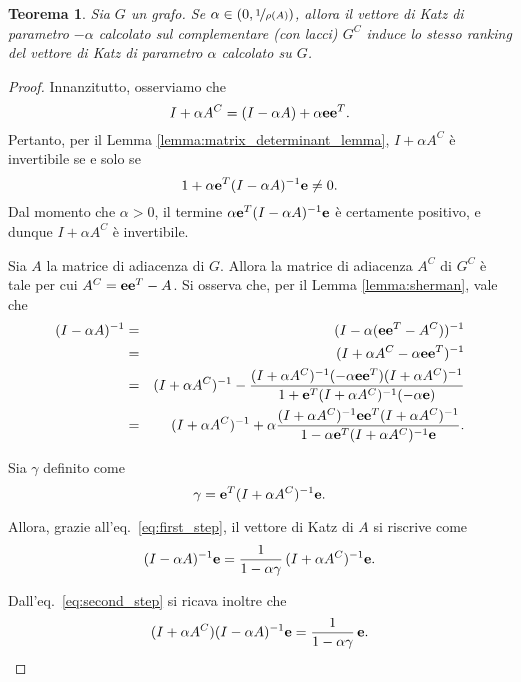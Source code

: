 \documentclass[a4paper]{article}
\newcommand{\evec}{{\bf e}}
\newtheorem{theorem}{Teorema}
\begin{document}
\begin{theorem}
    \label{th:compl_1}
    Sia $G$ un grafo. Se $\alpha \in (0, \nicefrac{1}{\rho(A)})$, allora il vettore di Katz di parametro $-\alpha$ calcolato sul complementare (con lacci) $G^C$
    induce lo stesso ranking del vettore di Katz di parametro $\alpha$ calcolato su $G$.
\end{theorem}

\begin{proof}
    Innanzitutto, osserviamo che
    \[ I+\alpha A^C = (I-\alpha A)+\alpha \evec \evec^T. \]
    Pertanto, per il Lemma \ref{lemma:matrix_determinant_lemma},
    $I + \alpha A^C$ è invertibile se e solo se
    \[ 1 + \alpha \evec^T (I - \alpha A)^{-1} \evec \neq 0. \]
    Dal momento che $\alpha > 0$, il termine $\alpha \evec^T (I - \alpha A)^{-1} \evec$ è certamente positivo, e dunque $I + \alpha A^C$ è invertibile.

    Sia $A$ la matrice di adiacenza di $G$. Allora la matrice di adiacenza
    $A^C$ di $G^C$ è tale per cui $A^C = \evec \evec^T - A$. Si osserva
    che, per il Lemma \ref{lemma:sherman}, vale che
    \begin{eqnarray}
        (I-\alpha A)^{-1}
        &=& (I - \alpha (\evec \evec^T - A^C))^{-1} \nonumber \\
        &=& (I+\alpha A^C-\alpha \evec \evec^T)^{-1} \nonumber \\
        &=& (I + \alpha A^C)^{-1} - \frac{(I + \alpha A^C)^{-1} (-\alpha \evec \evec^T) (I + \alpha A^C)^{-1}}{1 + \evec^T (I + \alpha A^C)^{-1} (-\alpha \evec)} \nonumber \\
        &=& (I + \alpha A^C)^{-1} + \alpha \frac{(I + \alpha A^C)^{-1} \evec \evec^T (I + \alpha A^C)^{-1}}{1 - \alpha \evec^T (I + \alpha A^C)^{-1} \evec}. \label{eq:first_step}
    \end{eqnarray}

    Sia $\gamma$ definito come
    \[
        \gamma = \evec^T (I + \alpha A^C)^{-1} \evec.
    \]

    Allora, grazie all'eq.~\eqref{eq:first_step}, il vettore di Katz di $A$ si riscrive come
    \begin{equation}
        \label{eq:second_step}
        (I-\alpha A)^{-1} \evec = \frac{1}{1 - \alpha \gamma} \, (I + \alpha A^C)^{-1} \evec.
    \end{equation}

    Dall'eq.~\eqref{eq:second_step} si ricava inoltre che
    \begin{equation} \label{eq:third_step}
        (I + \alpha A^C) (I-\alpha A)^{-1} \evec = \frac{1}{1 - \alpha \gamma} \, \evec.
    \end{equation}


\end{proof}
\end{document}
